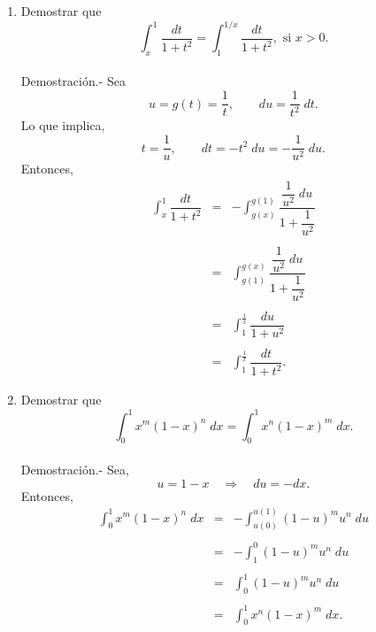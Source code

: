 \begin{enumerate}[\bfseries 1.]
    \item Demostrar que
    $$\int_x^1\dfrac{dt}{1+t^2}=\int_1^{1/x} \dfrac{dt}{1+t^2}, \mbox{ si } x>0.$$\\
    	Demostración.-\; Sea 
	$$u=g(t)=\dfrac{1}{t},\qquad du=\dfrac{1}{t^2}\; dt.$$
	Lo que implica,
	$$t=\dfrac{1}{u},\qquad dt=-t^2\; du = -\dfrac{1}{u^2}\; du.$$
	Entonces,
	$$\begin{array}{rcl}
	    \displaystyle\int_x^1 \dfrac{dt}{1+t^2} &=&\displaystyle -\int_{g(x)}^{g(1)} \dfrac{\dfrac{1}{u^2}\; du}{1+\dfrac{1}{u^2}}\\\\
						    &=&\displaystyle\int_{g(1)}^{g(x)} \dfrac{\dfrac{1}{u^2}\; du}{1+\dfrac{1}{u^2}}\\\\
						    &=&\displaystyle\int_1^{\frac{1}{x}}\dfrac{du}{1+u^2}\\\\
						    &=&\int_1^{\frac{1}{x}} \dfrac{dt}{1+t^2}.
	\end{array}$$
	\vspace{.5cm}

	\item Demostrar que
	$$\int_0^1 x^m (1-x)^n\; dx = \int_0^1 x^n(1-x)^m\; dx.$$\\
	    Demostración.-\; Sea,
	    $$u=1-x\quad \Rightarrow \quad du=-dx.$$
	    Entonces,
	    $$\begin{array}{rcl}
		\displaystyle\int_0^1 x^m (1-x)^n\; dx &=&-\displaystyle\int_{u(0)}^{u(1)} (1-u)^mu^n\; du\\\\
						      &=&-\displaystyle\int_1^0 (1-u)^m u^n\; du\\\\
						      &=&\displaystyle\int_0^1 (1-u)^m u^n\; du\\\\
						      &=&\displaystyle\int_0^1 x^n (1-x)^m\; dx.
	    \end{array}$$
	    \vspace{.5cm}


\end{enumerate}
